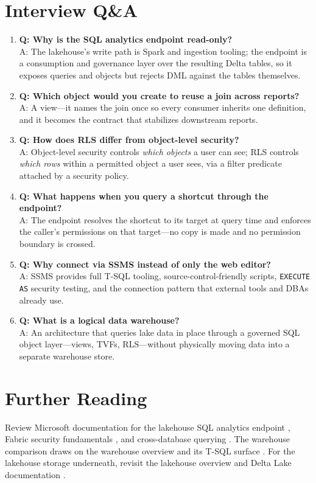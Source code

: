 \section{Interview Q\&A}
\begin{enumerate}
    \item \textbf{Q: Why is the SQL analytics endpoint read-only?}\\
    A: The lakehouse's write path is Spark and ingestion tooling; the endpoint is a consumption and governance layer over the resulting Delta tables, so it exposes queries and objects but rejects DML against the tables themselves.
    \item \textbf{Q: Which object would you create to reuse a join across reports?}\\
    A: A view---it names the join once so every consumer inherits one definition, and it becomes the contract that stabilizes downstream reports.
    \item \textbf{Q: How does RLS differ from object-level security?}\\
    A: Object-level security controls \emph{which objects} a user can see; RLS controls \emph{which rows} within a permitted object a user sees, via a filter predicate attached by a security policy.
    \item \textbf{Q: What happens when you query a shortcut through the endpoint?}\\
    A: The endpoint resolves the shortcut to its target at query time and enforces the caller's permissions on that target---no copy is made and no permission boundary is crossed.
    \item \textbf{Q: Why connect via SSMS instead of only the web editor?}\\
    A: SSMS provides full T-SQL tooling, source-control-friendly scripts, \texttt{EXECUTE AS} security testing, and the connection pattern that external tools and DBAs already use.
    \item \textbf{Q: What is a logical data warehouse?}\\
    A: An architecture that queries lake data in place through a governed SQL object layer---views, TVFs, RLS---without physically moving data into a separate warehouse store.
\end{enumerate}

\section{Further Reading}
Review Microsoft documentation for the lakehouse SQL analytics endpoint \cite{microsoftFabricSqlEndpoint}, Fabric security fundamentals \cite{microsoftFabricSecurity}, and cross-database querying \cite{microsoftFabricCrossQuery}. The warehouse comparison draws on the warehouse overview \cite{microsoftFabricWarehouse} and its T-SQL surface \cite{microsoftFabricWarehouseTSQL}. For the lakehouse storage underneath, revisit the lakehouse overview \cite{microsoftFabricLakehouse} and Delta Lake documentation \cite{deltaLakeDocs}.

